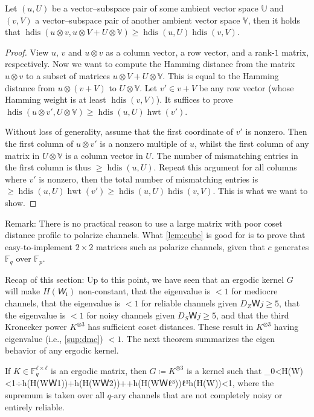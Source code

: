 \documentclass[openany]{amsbook}
\numberwithin{equation}{chapter}
\numberwithin{figure}{chapter}
\numberwithin{table}{chapter}
\DeclareMathOperator\hdis{hdis}
\DeclareMathOperator\hwt{hwt}
\def\bma#1{\begin{bmatrix}#1\end{bmatrix}}
\def\[#1\]{\begin{equation*}{#1}\end{equation*}}
\theoremstyle{definition}	理dfn:Definition~?s			理exa:Example~?s
\theoremstyle{remark}		理cla:Claim~?s				理rem:Remark~?s
\begin{document}
	\begin{lem}\label{lem:tensor}
		Let $(u,U)$ be a vector--subspace pair of some ambient vector space $𝕌$
		and $(v,V)$ a vector--subspace pair of another ambient vector space $𝕍$,
		then it holds that $\hdis(u⊗v,u⊗V+U⊗𝕍)≥\hdis(u,U)\hdis(v,V)$.
	\end{lem}
	
	\begin{proof}
		View $u$, $v$ and $u⊗v$ as a
		column vector, a row vector, and a rank-$1$ matrix, respectively.
		Now we want to compute the Hamming distance
		from the matrix $u⊗v$ to a subset of matrices $u⊗V+U⊗𝕍$.
		This is equal to the Hamming distance from $u⊗(v+V)$ to $U⊗𝕍$.
		Let $v'∈v+V$ be any row vector (whose Hamming weight is at least $\hdis(v,V)$).
		It suffices to prove $\hdis(u⊗v',U⊗𝕍)≥\hdis(u,U)\hwt(v')$.
		
		Without loss of generality, assume that the first coordinate of $v'$ is nonzero.
		Then the first column of $u⊗v'$ is a nonzero multiple of $u$,
		whilst the first column of any matrix in $U⊗𝕍$ is a column vector in $U$.
		The number of mismatching entries in the first column is thus $≥\hdis(u,U)$.
		Repeat this argument for all columns where $v'$ is nonzero,
		then the total number of mismatching entries is
		$≥\hdis(u,U)\hwt(v')≥\hdis(u,U)\hdis(v,V)$.
		This is what we want to show.
	\end{proof}
	
	Remark:
	There is no practical reason to use a large matrix
	with poor coset distance profile to polarize channels.
	What \cref{lem:cube} is good for is to prove that
	easy-to-implement $2×2$ matrices such as
	\[\bma{
		1	&	0	\\
		c	&	1	
	}\]
	polarize channels, given that $c$ generates $𝔽_q$ over $𝔽_p$.
	
	Recap of this section:
	Up to this point, we have seen that
	an ergodic kernel $G$ will make $H(𝘞₁)$ non-constant,
	that the eigenvalue is $<1$ for mediocre channels,
	that the eigenvalue is $<1$ for reliable channels given $D_ZＷj≥5$,
	that the eigenvalue is $<1$ for noisy channels given $D_SＷj≥5$,
	and that the third Kronecker power $K^{⊗3}$ has sufficient coset distances.
	These result in $K^{⊗3}$ having eigenvalue (i.e., \cref{sup:dmc}) $<1$.
	The next theorem summarizes the eigen behavior of any ergodic kernel.
	
	\begin{thm}\label{thm:dmc-eigen}
		If $K∈𝔽_q^{ℓ×ℓ}$ is an ergodic matrix, then $G≔K^{⊗3}$ is a kernel such that
		\[\sup_{0<H(W)<1}÷{h(H(WＷ1))+h(H(WＷ2))+\dotsb+h(H(WＷ{ℓ³}))}{ℓ³h(H(W))}<1,\]
		where the supremum is taken over all $q$-ary channels
		that are not completely noisy or entirely reliable.
	\end{thm}
	
\end{document}
